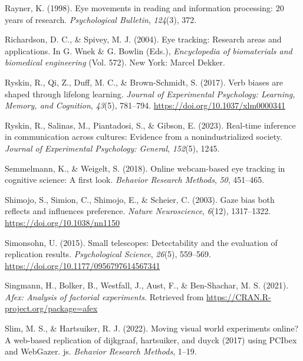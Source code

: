 \documentclass[
  man,floatsintext]{apa6}
\newlength{\cslhangindent}
\newlength{\cslentryspacingunit} %
\newenvironment{CSLReferences}[2] %
 {%
  \setlength{\parindent}{0pt}
  \ifodd #1
  \let\oldpar\par
  \def\par{\hangindent=\cslhangindent\oldpar}
  \fi
  \setlength{\parskip}{#2\cslentryspacingunit}
 }%
 {}
\begin{document}
\begin{CSLReferences}{1}{0}
\leavevmode{}%
Rayner, K. (1998). Eye movements in reading and information processing: 20 years of research. \emph{Psychological Bulletin}, \emph{124}(3), 372.

\leavevmode{}%
Richardson, D. C., \& Spivey, M. J. (2004). Eye tracking: {Research} areas and applications. In G. Wnek \& G. Bowlin (Eds.), \emph{Encyclopedia of biomaterials and biomedical engineering} (Vol. 572). New York: Marcel Dekker.

\leavevmode{}%
Ryskin, R., Qi, Z., Duff, M. C., \& Brown-Schmidt, S. (2017). Verb biases are shaped through lifelong learning. \emph{Journal of Experimental Psychology: Learning, Memory, and Cognition}, \emph{43}(5), 781--794. \url{https://doi.org/10.1037/xlm0000341}

\leavevmode{}%
Ryskin, R., Salinas, M., Piantadosi, S., \& Gibson, E. (2023). Real-time inference in communication across cultures: Evidence from a nonindustrialized society. \emph{Journal of Experimental Psychology: General}, \emph{152}(5), 1245.

\leavevmode{}%
Semmelmann, K., \& Weigelt, S. (2018). Online webcam-based eye tracking in cognitive science: A first look. \emph{Behavior Research Methods}, \emph{50}, 451--465.

\leavevmode{}%
Shimojo, S., Simion, C., Shimojo, E., \& Scheier, C. (2003). Gaze bias both reflects and influences preference. \emph{Nature Neuroscience}, \emph{6}(12), 1317--1322. \url{https://doi.org/10.1038/nn1150}

\leavevmode{}%
Simonsohn, U. (2015). Small telescopes: Detectability and the evaluation of replication results. \emph{Psychological Science}, \emph{26}(5), 559--569. \url{https://doi.org/10.1177/0956797614567341}

\leavevmode{}%
Singmann, H., Bolker, B., Westfall, J., Aust, F., \& Ben-Shachar, M. S. (2021). \emph{Afex: Analysis of factorial experiments}. Retrieved from \url{https://CRAN.R-project.org/package=afex}

\leavevmode{}%
Slim, M. S., \& Hartsuiker, R. J. (2022). Moving visual world experiments online? A web-based replication of dijkgraaf, hartsuiker, and duyck (2017) using PCIbex and WebGazer. js. \emph{Behavior Research Methods}, 1--19.


\end{CSLReferences}
\end{document}
